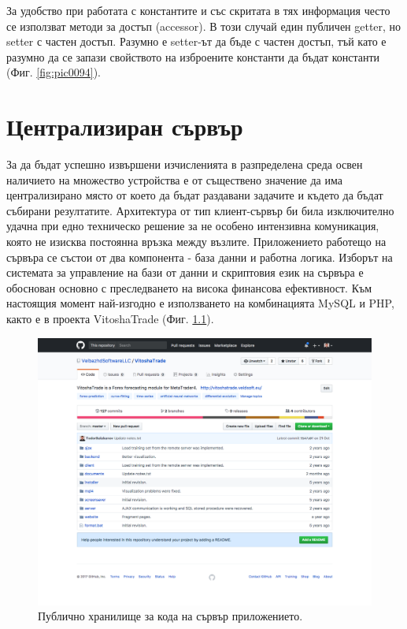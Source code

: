 \documentclass[book,14pt,oneside,openany]{memoir}
\begin{document}
За удобство при работата с константите и със скритата в тях информация често се използват методи за достъп (accessor). В този случай един публичен getter, но setter с частен достъп. Разумно е setter-ът да бъде с частен достъп, тъй като е разумно да се запази свойството на изброените константи да бъдат константи (Фиг. \ref{fig:pic0094}).

\newpage
\chapter{Централизиран сървър}
\label{chapter05}

За да бъдат успешно извършени изчисленията в разпределена среда освен наличието на множество устройства е от съществено значение да има централизирано място от което да бъдат раздавани задачите и където да бъдат събирани резултатите. Архитектура от тип клиент-сървър би била изключително удачна при едно техническо решение за не особено интензивна комуникация, която не изисква постоянна връзка между възлите. Приложението работещо на сървъра се състои от два компонента - база данни и работна логика. Изборът на системата за управление на бази от данни и скриптовия език на сървъра е обоснован основно с преследването на висока финансова ефективност. Към настоящия момент най-изгодно е използването на комбинацията MySQL и PHP, както е в проекта VitoshaTrade\cite{vtrade} (Фиг. \ref{fig:pic0095}).

\begin{figure}[h]
  \centering
  \includegraphics[height=0.45\pdfpageheight]{pic0095}
  \caption{Публично хранилище за кода на сървър приложението.}
\label{fig:pic0095}
\end{figure}
\FloatBarrier
\end{document}
